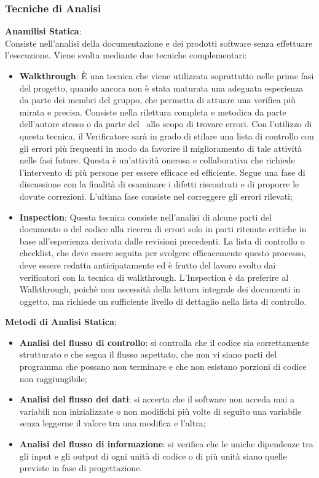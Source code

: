 \subsubsection{Tecniche di Analisi}
\textbf{Anamilisi Statica}:\medskip \\ 
Consiste nell'analisi della documentazione e dei prodotti software senza effettuare l'esecuzione. Viene svolta mediante due tecniche complementari:
\begin{itemize}
	\item \textbf{Walkthrough}:
	È una tecnica che viene utilizzata soprattutto nelle prime fasi del progetto, quando ancora non è stata maturata una adeguata esperienza da parte dei membri del gruppo, che permetta di attuare una verifica più mirata e precisa. Consiste nella rilettura completa e metodica da
	parte dell'autore stesso o da parte del \ruoloVerificatore\ allo scopo di trovare errori. Con l'utilizzo di questa tecnica, il Verificatore sarà in grado di stilare una lista di controllo con gli errori più frequenti in modo da favorire il miglioramento di tale attività nelle fasi future. Questa è un'attività onerosa e collaborativa che richiede l'intervento di più persone per essere efficace ed efficiente. Segue una fase di discussione con la finalità di esaminare i difetti riscontrati e di proporre le dovute correzioni. L'ultima fase consiste nel correggere gli errori rilevati;
	
	\item \textbf{Inspection}:
	Questa tecnica consiste nell'analisi di alcune parti del documento o del codice alla ricerca di errori solo in parti ritenute critiche in base all'esperienza derivata dalle revisioni precedenti. La lista di controllo o checklist, che deve essere seguita per svolgere efficacemente questo processo, deve essere redatta anticipatamente ed è frutto del lavoro svolto dai verificatori con la tecnica di walkthrough. L'Inspection è da preferire al Walkthrough, poichè  non necessità della lettura integrale dei documenti in oggetto, ma richiede un sufficiente livello di dettaglio nella lista di controllo.	    
\end{itemize}
\textbf{Metodi di Analisi Statica}:
\begin{itemize}
	\item \textbf{Analisi del flusso di controllo}: si controlla che il codice sia correttamente strutturato e che segua il flusso aspettato, che non vi siano parti del programma che possano non terminare e che non esistano porzioni di codice non raggiungibile;
	\item \textbf{Analisi del flusso dei dati}: si accerta che il software non acceda mai a variabili non inizializzate o non modifichi più volte di seguito una variabile senza leggerne il valore tra una modifica e l'altra;
	\item \textbf{Analisi del flusso di informazione}: si verifica che le uniche dipendenze tra gli input e gli output di ogni unità di codice o di più unità siano quelle previste in fase di progettazione.
\end{itemize}
